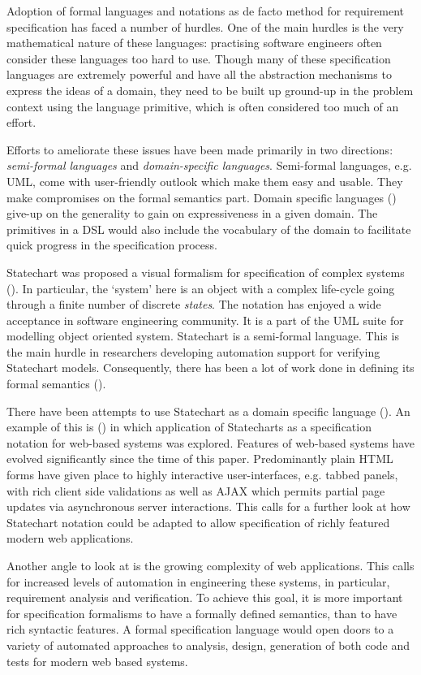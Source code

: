 \documentclass[12pt,a4paper]{article}
\begin{document}
Adoption of formal languages and notations as de facto method for requirement specification has faced a number of hurdles. One of the main hurdles is the very mathematical nature of these languages: practising software engineers often consider these languages too hard to use. Though many of these specification languages are extremely powerful and have all the abstraction mechanisms to express the ideas of a domain, they need to be built up ground-up in the problem context using the language primitive, which is often considered too much of an effort.

Efforts to ameliorate these issues have been made primarily in two directions: \emph{semi-formal languages} and \emph{domain-specific languages}. Semi-formal languages, e.g. UML, come with user-friendly outlook which make them easy and usable. They make compromises on the formal semantics part. Domain specific languages () give-up on the generality to gain on expressiveness in a given domain. The primitives in a DSL would also include the vocabulary of the domain to facilitate quick progress in the specification process.

Statechart was proposed a visual formalism for specification of complex systems (). In particular, the `system' here is an object with a complex life-cycle going through a finite number of discrete \emph{states}. The notation has enjoyed a wide acceptance in software engineering community. It is a part of the UML suite for modelling object oriented system. Statechart is a semi-formal language. This is the main hurdle in researchers developing automation support for verifying Statechart models. Consequently, there has been a lot of work done in defining its formal semantics ().

There have been attempts to use Statechart as a domain specific language (). An example of this is () in which application of Statecharts as a specification notation for web-based systems was explored. Features of web-based systems have evolved significantly since the time of this paper. Predominantly plain HTML forms have given place to highly interactive user-interfaces, e.g. tabbed panels, with rich client side validations as well as AJAX which permits partial page updates via asynchronous server interactions. This calls for a further look at how Statechart notation could be adapted to allow specification of richly featured modern web applications.

Another angle to look at is the growing complexity of web applications. This calls for increased levels of automation in engineering these systems, in particular, requirement analysis and verification. To achieve this goal, it is more important for specification formalisms to have a formally defined semantics,  than to have rich syntactic features. A formal specification language would open doors to a variety of automated approaches to analysis, design, generation of both code and tests for modern web based systems.
\end{document}
